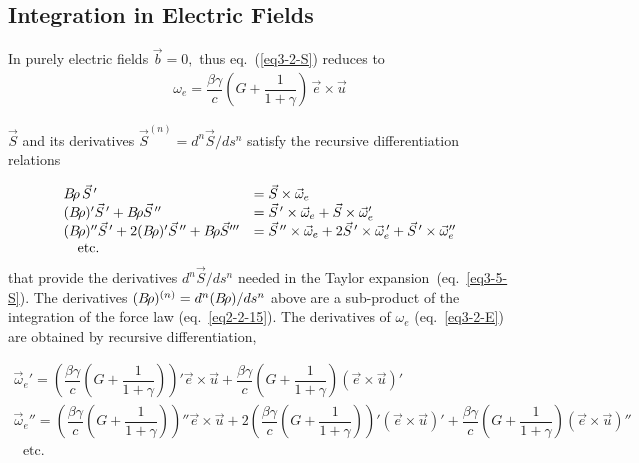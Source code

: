 \subsection[Integration in Electric Fields]{Integration in Electric Fields}

        \label{sec2.2.2-E} %

In purely electric fields  $ \vec  b=0, $ thus eq.~(\ref{eq3-2-S}) reduces to
\begin{gather}
 \omega_e = \dfrac{\beta \gamma}{c}(G + \dfrac{1}{1+\gamma}) \, \vec e\times \vec u  \label{eq3-2-E}  
\end{gather}

\noindent $\vec S$ and its derivatives $ \vec  S^{(n)} = d^n\vec  S / ds^n $ 
satisfy the  recursive differentiation relations

\begin{equation}
	\begin{array}{ll}
	 B\!\rho \, \vec S^{\,\prime} &= \vec  S \times \vec \omega_e \\
		(B\!\rho)^\prime \vec  S^{\,\prime} 
		     +B\!\rho \vec  S^{\,\prime\prime}  & =  \vec S^{\,\prime}  \times \vec \omega_e + \vec  S \times \vec \omega_e'       \\
		(B\!\rho)^{\prime\prime}\vec  S^{\,\prime}
		      + 2(B\!\rho)^\prime \vec  S^{\,\prime\prime} 
		      +B\!\rho \vec  S^{\prime\prime\prime}  & =
   \vec  S^{\,\prime\prime}  \times \vec \omega_e + 2\vec S^{\,\prime}  \times \vec \omega_e^{\,\prime}  + \vec  S^{\,\prime}  \times \vec \omega_e''       \\
          ~ ~  ~    \textrm{etc.}
	\end{array}
	\label{eq2-2-9-E}
\end{equation} 
\noindent that provide the derivatives $ d^n\vec  S / ds^n$ needed in the Taylor 
expansion~(eq.~\ref{eq3-5-S}).  
 The derivatives $ (B\!\rho)^{(n)} =   d^n(B\!\rho ) / ds^n $  above are a sub-product of the integration of the 
force law (eq.~\ref{eq2-2-15}). The derivatives of $\omega_e$ (eq.~\ref{eq3-2-E}) are obtained 
by recursive differentiation, 

\begin{equation}
	\begin{array}{l}
 \vec \omega_e' = \left( \dfrac{\beta \gamma}{c}(G + \dfrac{1}{1+\gamma})\right)' \vec e \times \vec u   
  +   \dfrac{\beta \gamma}{c}(G + \dfrac{1}{1+\gamma})\left( \vec e \times \vec u   \right)'  \\
 \vec \omega_e'' = \left( \dfrac{\beta \gamma}{c}(G + \dfrac{1}{1+\gamma})\right)'' \vec e \times \vec u   
  +  2 \left( \dfrac{\beta \gamma}{c}(G + \dfrac{1}{1+\gamma}) \right)' \left( \vec e \times \vec u   \right)'  
  +   \dfrac{\beta \gamma}{c}(G + \dfrac{1}{1+\gamma})\left( \vec e \times \vec u   \right)''  \\
          ~ ~ ~       \textrm{etc.}
	\end{array}
	\label{eqOmega-E}
\end{equation} 

